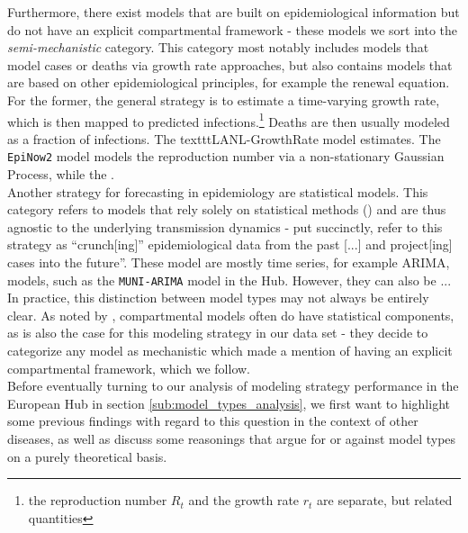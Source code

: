 Furthermore, there exist models that are built on epidemiological information but do not have an explicit compartmental framework - these models we sort into the \textit{semi-mechanistic} category. This category most notably includes models that model cases or deaths via growth rate approaches, but also contains models that are based on other epidemiological principles, for example the renewal equation. For the former, the general strategy is to estimate a time-varying growth rate, which is then mapped to predicted infections.\footnote{the reproduction number $R_t$ and the growth rate $r_t$ are separate, but related quantities} Deaths are then usually modeled as a fraction of infections. The texttt{LANL-GrowthRate} model estimates. The \texttt{EpiNow2} model models the reproduction number via a non-stationary Gaussian Process,  while the . \\
Another strategy for forecasting in epidemiology are statistical models. %
This category refers to models that rely solely on statistical methods () and are thus agnostic to the underlying transmission dynamics - put succinctly, \cite{holmdahl_wrong_2020} refer to this strategy as ``crunch[ing]'' epidemiological data from the past [...] and project[ing] cases into the future''. These model are mostly time series, for example ARIMA, models, such as the \texttt{MUNI-ARIMA} model in the Hub. However, they can also be ...\\
In practice, this distinction between model types may not always be entirely clear. As noted by \cite{reich_collaborative_2019}, compartmental models often do have statistical components, as is also the case for this modeling strategy in our data set - they decide to categorize any model as mechanistic which made a mention of having an explicit compartmental framework, which we follow.\\
Before eventually turning to our analysis of modeling strategy performance in the European Hub in section \ref{sub:model_types_analysis}, we first want to highlight some previous findings with regard to this question in the context of other diseases, as well as discuss some reasonings that argue for or against model types on a purely theoretical basis.\\
